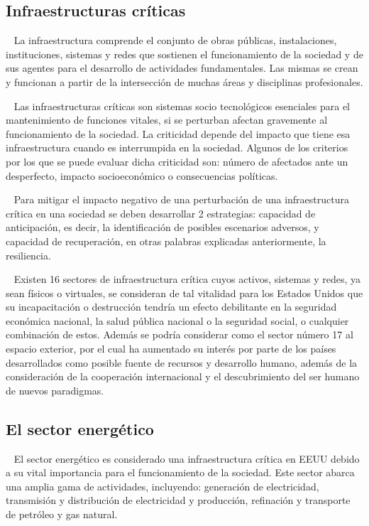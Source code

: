\documentclass{article}
\begin{document}
\hypertarget{infraestructuras-cruxedticas}{%
\subsection{Infraestructuras
críticas}\label{infraestructuras-cruxedticas}}

~ La infraestructura comprende el conjunto de obras públicas,
instalaciones, instituciones, sistemas y redes que sostienen el
funcionamiento de la sociedad y de sus agentes para el desarrollo de
actividades fundamentales. Las mismas se crean y funcionan a partir de
la intersección de muchas áreas y disciplinas profesionales.

~ Las infraestructuras críticas son sistemas socio tecnológicos
esenciales para el mantenimiento de funciones vitales, si se perturban
afectan gravemente al funcionamiento de la sociedad. La criticidad
depende del impacto que tiene esa infraestructura cuando es interrumpida
en la sociedad. Algunos de los criterios por los que se puede evaluar
dicha criticidad son: número de afectados ante un desperfecto, impacto
socioeconómico o consecuencias políticas.

~ Para mitigar el impacto negativo de una perturbación de una
infraestructura crítica en una sociedad se deben desarrollar 2
estrategias: capacidad de anticipación, es decir, la identificación de
posibles escenarios adversos, y capacidad de recuperación, en otras
palabras explicadas anteriormente, la resiliencia.

~ Existen 16 sectores de infraestructura crítica cuyos activos, sistemas
y redes, ya sean físicos o virtuales, se consideran de tal vitalidad
para los Estados Unidos que su incapacitación o destrucción tendría un
efecto debilitante en la seguridad económica nacional, la salud pública
nacional o la seguridad social, o cualquier combinación de estos. Además
se podría considerar como el sector número 17 al espacio exterior, por
el cual ha aumentado su interés por parte de los países desarrollados
como posible fuente de recursos y desarrollo humano, además de la
consideración de la cooperación internacional y el descubrimiento del
ser humano de nuevos paradigmas.

\hypertarget{el-sector-energuxe9tico}{%
\subsection{El sector energético}\label{el-sector-energuxe9tico}}

~ El sector energético es considerado una infraestructura crítica en
EEUU debido a su vital importancia para el funcionamiento de la
sociedad. Este sector abarca una amplia gama de actividades, incluyendo:
generación de electricidad, transmisión y distribución de electricidad y
producción, refinación y transporte de petróleo y gas natural.
\end{document}
